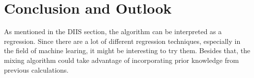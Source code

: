 \chapter{Conclusion and Outlook}
\label{ch:conclusion_outlook}



As mentioned in the DIIS section, the algorithm can be interpreted as a regression. Since there are a lot of different regression techniques, especially in the field of machine learing, it might be interesting to try them. Besides that, the mixing algorithm could take advantage of incorporating prior knowledge from previous calculations.

